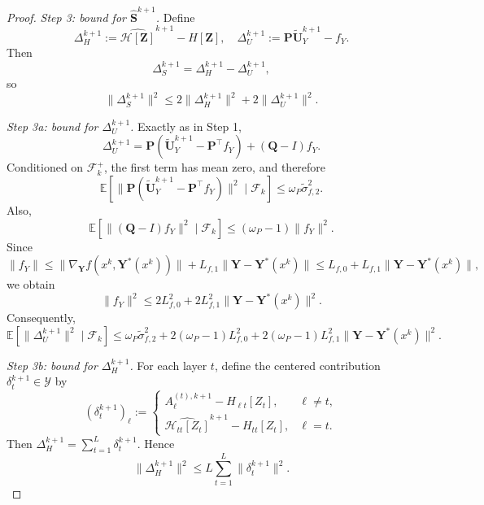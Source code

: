 \documentclass{pkumelon}
\theoremstyle{plain}
\newcommand{\E}{\mathbb{E}}
\begin{document}
\begin{proof}
\emph{Step 3: bound for $\widehat{\boldsymbol S}^{k+1}$.} Define
\begin{equation*}
\Delta_H^{k+1} := \widehat{\mathcal H[\boldsymbol Z]}^{k+1}-H[\boldsymbol Z], \quad \Delta_U^{k+1} := \boldsymbol P\tilde{\boldsymbol U}_Y^{k+1}-f_Y.
\end{equation*}
Then
\begin{equation*}
\Delta_S^{k+1}=\Delta_H^{k+1}-\Delta_U^{k+1},
\end{equation*}
so
\begin{equation}\label{eq:DeltaS_split_active}
\|\Delta_S^{k+1}\|^2
\le
2\|\Delta_H^{k+1}\|^2+2\|\Delta_U^{k+1}\|^2.
\end{equation}

\emph{Step 3a: bound for $\Delta_U^{k+1}$.} Exactly as in Step 1,
\begin{equation*}
\Delta_U^{k+1} = \boldsymbol P(\tilde{\boldsymbol U}_Y^{k+1}-\boldsymbol P^\top f_Y) +(\boldsymbol Q-I)f_Y.
\end{equation*}
Conditioned on $\mathcal F_k^+$, the first term has mean zero, and therefore
\begin{equation*}
\E[\|\boldsymbol P(\tilde{\boldsymbol U}_Y^{k+1}-\boldsymbol P^\top f_Y)\|^2\mid \mathcal F_k] \le \omega_P\tilde\sigma_{f,2}^2.
\end{equation*}
Also,
\begin{equation*}
\E[\|(\boldsymbol Q-I)f_Y\|^2\mid \mathcal F_k] \le (\omega_P-1)\|f_Y\|^2.
\end{equation*}
Since
\begin{equation*}
\|f_Y\| \le \|\nabla_{\boldsymbol Y}f(x^k,\boldsymbol Y^*(x^k))\| + L_{f,1}\|\boldsymbol Y-\boldsymbol Y^*(x^k)\| \le L_{f,0}+L_{f,1}\|\boldsymbol Y-\boldsymbol Y^*(x^k)\|,
\end{equation*}
we obtain
\begin{equation*}
\|f_Y\|^2 \le 2L_{f,0}^2+2L_{f,1}^2\|\boldsymbol Y-\boldsymbol Y^*(x^k)\|^2.
\end{equation*}
Consequently,
\begin{equation}\label{eq:DeltaU_bound_active}
\E[\|\Delta_U^{k+1}\|^2\mid \mathcal F_k]
\le
\omega_P\tilde\sigma_{f,2}^2
+2(\omega_P-1)L_{f,0}^2
+2(\omega_P-1)L_{f,1}^2\|\boldsymbol Y-\boldsymbol Y^*(x^k)\|^2.
\end{equation}

\emph{Step 3b: bound for $\Delta_H^{k+1}$.} For each layer $t$, define the centered contribution $\delta_t^{k+1}\in\mathcal Y$ by
\begin{equation*}
(\delta_t^{k+1})_\ell
:=
\begin{cases}
A_\ell^{(t),k+1}-H_{\ell t}[Z_t], & \ell\neq t,\\[1mm]
\widehat{\mathcal H_{tt}[Z_t]}^{k+1}-H_{tt}[Z_t], & \ell=t.
\end{cases}
\end{equation*}
Then $\Delta_H^{k+1}=\sum_{t=1}^L \delta_t^{k+1}$. Hence
\begin{equation}\label{eq:DeltaH_sum_active}
\|\Delta_H^{k+1}\|^2
\le
L\sum_{t=1}^L \|\delta_t^{k+1}\|^2.
\end{equation}


\end{proof}
\end{document}
